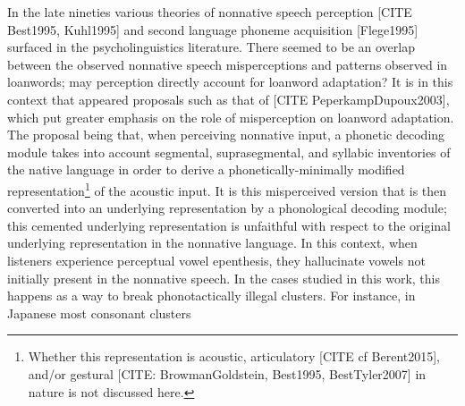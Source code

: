 In the late nineties various theories of nonnative speech perception [CITE Best1995, Kuhl1995] and second language phoneme acquisition [Flege1995] surfaced in the psycholinguistics literature. There seemed to be an overlap between the observed nonnative speech misperceptions and patterns observed in loanwords; may perception directly account for loanword adaptation?   
It is in this context that appeared proposals such as that of [CITE PeperkampDupoux2003], which put greater emphasis on the role of misperception on loanword adaptation. The proposal being that, when perceiving nonnative input, a phonetic decoding module takes into account segmental, suprasegmental, and syllabic inventories of the native language in order to derive a phonetically-minimally modified representation\footnote{Whether this representation is acoustic, articulatory [CITE cf Berent2015], and/or gestural [CITE: BrowmanGoldstein, Best1995, BestTyler2007] in nature is not discussed here.} of the acoustic input. It is this misperceived version that is then converted into an underlying representation by a phonological decoding module; this cemented underlying representation is unfaithful with respect to the original underlying representation in the nonnative language.  
In this context, when listeners experience perceptual vowel epenthesis, they hallucinate vowels not initially present in the nonnative speech. In the cases studied in this work, this happens as a way to break phonotactically illegal clusters. For instance, in Japanese most consonant clusters%
